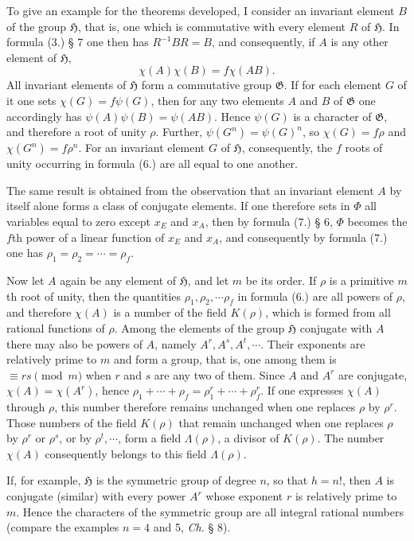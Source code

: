 \documentclass[11pt]{article}
\newcommand{\Hgrp}{\mathfrak{H}}
\newcommand{\Ggrp}{\mathfrak{G}}
\begin{document}
To give an example for the theorems developed, I consider an invariant element $B$ of the group $\Hgrp$, that is, one which is commutative with every element $R$ of $\Hgrp$. In formula (3.) § 7 one then has $R^{-1}BR=B$, and consequently, if $A$ is any other element of $\Hgrp$,
\[
\chi(A)\chi(B)=f\chi(AB).
\]
All invariant elements of $\Hgrp$ form a commutative group $\Ggrp$. If for each element $G$ of it one sets $\chi(G)=f\psi(G)$, then for any two elements $A$ and $B$ of $\Ggrp$ one accordingly has $\psi(A)\psi(B)=\psi(AB)$. Hence $\psi(G)$ is a character of $\Ggrp$, and therefore a root of unity $\rho$. Further, $\psi(G^n)=\psi(G)^n$, so $\chi(G)=f\rho$ and $\chi(G^n)=f\rho^n$. For an invariant element $G$ of $\Hgrp$, consequently, the $f$ roots of unity occurring in formula (6.) are all equal to one another.

The same result is obtained from the observation that an invariant element $A$ by itself alone forms a class of conjugate elements. If one therefore sets in $\Phi$ all variables equal to zero except $x_E$ and $x_A$, then by formula (7.) § 6, $\Phi$ becomes the $f$th power of a linear function of $x_E$ and $x_A$, and consequently by formula (7.) one has $\rho_1=\rho_2=\cdots=\rho_f$.

Now let $A$ again be any element of $\Hgrp$, and let $m$ be its order. If $\rho$ is a primitive $m$th root of unity, then the quantities $\rho_1,\rho_2,\cdots\rho_f$ in formula (6.) are all powers of $\rho$, and therefore $\chi(A)$ is a number of the field $K(\rho)$, which is formed from all rational functions of $\rho$. Among the elements of the group $\Hgrp$ conjugate with $A$ there may also be powers of $A$, namely $A^r,A^s,A^t,\cdots$. Their exponents are relatively prime to $m$ and form a group, that is, one among them is $\equiv rs\pmod m$ when $r$ and $s$ are any two of them. Since $A$ and $A^r$ are conjugate, $\chi(A)=\chi(A^r)$, hence $\rho_1+\cdots+\rho_f=\rho_1^r+\cdots+\rho_f^r$. If one expresses $\chi(A)$ through $\rho$, this number therefore remains unchanged when one replaces $\rho$ by $\rho^r$. Those numbers of the field $K(\rho)$ that remain unchanged when one replaces $\rho$ by $\rho^r$ or $\rho^s$, or by $\rho^t,\cdots$, form a field $\Lambda(\rho)$, a divisor of $K(\rho)$. The number $\chi(A)$ consequently belongs to this field $\Lambda(\rho)$.

If, for example, $\Hgrp$ is the symmetric group of degree $n$, so that $h=n!$, then $A$ is conjugate (similar) with every power $A^r$ whose exponent $r$ is relatively prime to $m$. Hence the characters of the symmetric group are all integral rational numbers (compare the examples $n=4$ and 5, \emph{Ch.} § 8).
\end{document}
